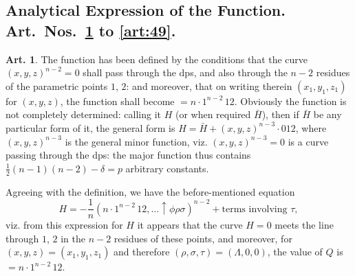 \documentclass[12pt,a4paper]{article}
\theoremstyle{definition}
\newtheorem{art}{Art.}[section]
\begin{document}
\subsection*{Analytical Expression of the Function. Art.~Nos.~\ref{art:42} to \ref{art:49}.}

\begin{art}\label{art:42}
The function has been defined by the conditions that the curve $(x, y, z)^{n-2} = 0$ shall pass through the dps, and also through the $n-2$ residues of the parametric points $1$, $2$: and moreover, that on writing therein $(x_1, y_1, z_1)$ for $(x, y, z)$, the function shall become $= n \cdot 1^{n-2}\,12$. Obviously the function is not completely determined: calling it $H$ (or when required $\bar{H}$), then if $\bar{H}$ be any particular form of it, the general form is $H = \bar{H} + (x, y, z)^{n-3} \cdot 012$, where $(x, y, z)^{n-3}$ is the general minor function, viz. $(x, y, z)^{n-3} = 0$ is a curve passing through the dps: the major function thus contains $\frac{1}{2}(n-1)(n-2) - \delta = p$ arbitrary constants.

Agreeing with the definition, we have the before-mentioned equation
\[
H = -\frac{1}{n}(n \cdot 1^{n-2}\,12, \ldots \uparrow\phi\rho\sigma)^{n-2} + \text{terms involving } \tau,
\]
viz. from this expression for $H$ it appears that the curve $H = 0$ meets the line through $1$, $2$ in the $n-2$ residues of these points, and moreover, for $(x, y, z) = (x_1, y_1, z_1)$ and therefore $(\rho, \sigma, \tau) = (\Lambda, 0, 0)$, the value of $Q$ is $= n \cdot 1^{n-2}\,12$.
\end{art}
\end{document}
